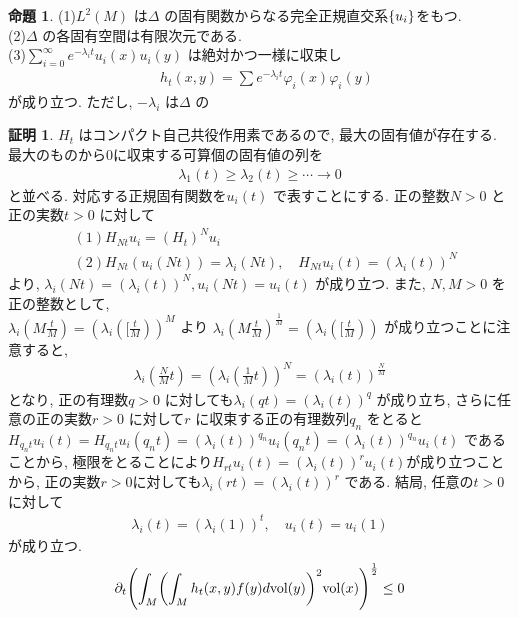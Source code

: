 \documentclass[twocolumn, landscape, a4paper , 8pt, fleqn, titlepage ]{jsarticle}
\theoremstyle{definition}
\newtheorem{prop}[dfn]{命題}
\newtheorem*{pf*}{証明}
\newcommand{\paren}[1]{\mleft( #1\mright )}
\newcommand{\cbra}[1]{\mleft\{#1\mright\}}
\newcommand{\vol}{\textrm{vol}}
\renewcommand{\-}{\hyphen}
\begin{document}
\begin{prop}
(1)$L^2(M)$ は$\Delta$ の固有関数からなる完全正規直交系$\cbra{u_i}$をもつ. \\
(2)$\Delta$ の各固有空間は有限次元である. \\
(3)$\sum_{i = 0}^\infty e^{-\lambda_i t} u_i (x) u_i (y)$ は絶対かつ一様に収束し
\begin{align*}\quad  h_t (x,y) = \sum e^{- \lambda_i t} \varphi_i (x) \varphi_i (y)  \end{align*}
\quad が成り立つ. ただし, $-\lambda_i$ は$\Delta$ の
\end{prop}
\begin{pf*}
$H_t$ はコンパクト自己共役作用素であるので, 最大の固有値が存在する. 最大のものから$0$に収束する可算個の固有値の列を
\begin{align*} \lambda_1 (t) \geq \lambda_2 (t) \geq \cdots \rightarrow 0 \end{align*}
と並べる. 対応する正規固有関数を$u_i (t)$ で表すことにする. 正の整数$N > 0$ と正の実数$t > 0$ に対して
\begin{align*} &(1)H_{Nt} u_i = (H_{t} )^N u_i  \\ &(2) H_{Nt} (u_i (Nt)) = \lambda_i (Nt), \quad H_{Nt}u_i (t) = (\lambda_i (t)) ^ N \end{align*}
より, $\lambda_i (Nt) = (\lambda_i (t)) ^N , u_i (Nt) = u_i (t) $ が成り立つ. また, $N, M>0$ を正の整数として, \\$\lambda_i (M \frac{t}{M}) = (\lambda_i ([\frac{t}{M}))^M$ より
$\lambda_i (M \frac{t}{M})^{\frac{1}{M}} = (\lambda_i ([\frac{t}{M}))$ が成り立つことに注意すると, 
\begin{align*} \lambda_i (\frac{N}{M} t) = (\lambda_i (\frac{1}{M} t))^ N = (\lambda_i(t) ) ^ \frac{N}{M}  \end{align*}
となり, 正の有理数$q>0$ に対しても$\lambda_i (qt) = (\lambda_i (t)) ^q$ が成り立ち, さらに任意の正の実数$r > 0$ に対して$r$ に収束する正の有理数列$q_n$ をとると
$H_{q_n t } u_i(t) = H_{q_n t } u_i(q_n t) = (\lambda_i (t)) ^{q_n} u_i (q_n t) = (\lambda_i (t)) ^{q_n} u_i (t) $ であることから, 極限をとることにより$H_{rt } u_i(t) =(\lambda_i (t)) ^{r} u_i (t)  $が成り立つことから, 正の実数$r>0$に対しても$\lambda_i (rt)  = (\lambda_i (t)) ^{r} $ である. 結局, 任意の$t>0$ に対して
\begin{align*} \lambda_i (t) = (\lambda_i (1) )^t , \quad u_i(t) = u_i (1)\end{align*}
が成り立つ. 
\begin{align*} \partial_t \paren{ \int_M \paren{ \int_M h_t (x,y) f(y) d\vol(y)} ^2  \vol(x) }^{\frac{1}{2}} \leq 0  \end{align*}

\end{pf*}
\end{document}
